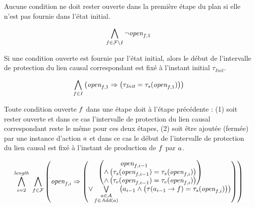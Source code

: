 Aucune condition ne doit rester ouverte dans la première étape du plan si elle n'est pas fournie dans l'état initial.

\begin{small}
\[
\Bigforall{\substack{\f\in \F\setminus \I}}\neg \open{\f}{1}%
\]
\end{small}

Si une condition ouverte est fournie par l'état initial, alors le début de l'intervalle de protection du lien causal correspondant est fixé à l'instant initial $\tau_{\textit{Init}}$.

\begin{small}
\[
\Bigforall{\substack{\f\in \I}}\left(\open{\f}{1} \Rightarrow \left(\tau_{\mathit{Init}} = \tau_{s}(\open{\f}{1})\right)\right)%
\]
\end{small}

Toute condition ouverte $f$ dans une étape doit à l'étape précédente : (1) soit rester ouverte et dans ce cas l'intervalle de protection du lien causal correspondant reste le même pour ces deux étapes, (2) soit être ajoutée (fermée) par une instance d'action $a$ et dans ce cas le début de l'intervalle de protection du lien causal est fixé à l'instant de production de $f$ par $a$.

\begin{small}
\[
\BigforallTwo{i=2}{\length}~\Bigforall{\substack{\f\in \F}}%
\begin{pmatrix}\open{\f}{i} \Rightarrow%
\begin{pmatrix}\begin{pmatrix}\open{\f}{i-1}\hfill\\ \wedge %
\left(\tau_{s}(\open{\f}{i-1}) = \tau_{s}(\open{\f}{i})\right)\hfill\\
 \wedge \left(\tau_{e}(\open{\f}{i-1}) = \tau_{e}(\open{\f}{i})
 \right)\end{pmatrix}\hfill\\
 \vee \bigvee\limits_{\substack{\a\in \A\\\f \in \add{\a}}}\left(\a_{i - 1} \wedge \left(\tau(\a_{i - 1}\rightarrow \f) = \tau_{s}(\open{\f}{i})\right)\right)\hfill\\
 \end{pmatrix}\end{pmatrix}%
\]
\end{small}


